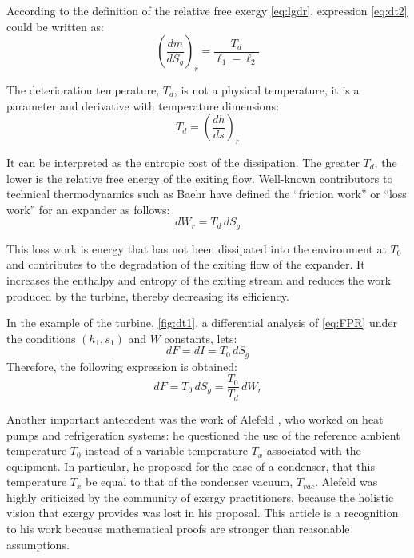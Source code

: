 \documentclass[energies,article,submit,moreauthors,pdftex]{Definitions/mdpi}
\begin{document}
According to the definition of the relative free exergy \cref{eq:lgdr}, expression \eqref{eq:dt2} could be written as:
\begin{equation}
\left(\frac{dm}{dS_g}\right)_r = \frac{T_d}{\ell_1 - \ell_2}
\label{eq:dt2g}
\end{equation}

The deterioration temperature, $T_d$, is not a physical temperature, it is a parameter and derivative with temperature dimensions:  
\begin{equation}
T_d=\left(\frac{dh}{ds}\right)_r
\end{equation}      

It can be interpreted as the entropic cost of the dissipation. The greater $T_d$, the lower is the relative free energy of the exiting flow.
Well-known contributors to technical thermodynamics such as Baehr \cite{Baehr2005,Baehr1979} have defined the “friction work” or “loss work” for an expander as follows: 
\begin{equation}
	dW_r=T_d\,dS_g
\end{equation}

This loss work is energy that has not been dissipated into the environment at $T_0$ and contributes to the degradation of the exiting flow of the expander. It increases the enthalpy and entropy of the exiting stream and reduces the work produced by the turbine, thereby decreasing its efficiency.

In the example of the turbine, \cref{fig:dt1}, a differential analysis of \cref{eq:FPR} under the conditions $(h_1,s_1)$ and $W$ constants, lets:
\begin{equation}
dF=dI=T_0\,dS_g
\label{eq:dfi}
\end{equation}
Therefore, the following expression is obtained:
\begin{equation}
dF=T_0\,dS_g=\frac{T_0}{T_d}\,dW_r
\end{equation}

Another important antecedent was the work of Alefeld \cite{Alefeld1988}, who worked on heat pumps and refrigeration systems: he questioned the use of the reference ambient temperature $T_0$ instead of a variable temperature $T_x$ associated with the equipment. In particular, he proposed for the case of a condenser, that this temperature $T_x$ be equal to that of the condenser vacuum, $T_{vac}$. Alefeld was highly criticized by the community of exergy practitioners, because the holistic vision that exergy provides was lost in his proposal. This article is a recognition to his work because mathematical proofs are stronger than reasonable assumptions.
\end{document}
